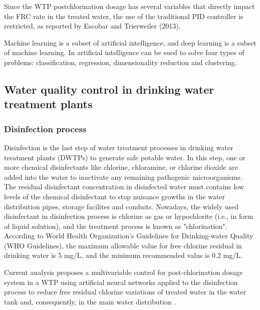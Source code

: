 Since the WTP postchlorination dosage has several variables that directly impact the FRC rate in the treated water, the use of the traditional PID controller is restricted, as reported by Escobar and Trierweiler (2013).

Machine learning is a subset of artificial intelligence, and deep learning is a subset 
of machine learning. In artificial intelligence can be sued to solve four types of problems: 
classification, regression, dimensionality reduction and clustering. 
\subsection{Water quality control in drinking water treatment plants}
\subsubsection{Disinfection process}
Disinfection is the last step of water treatment processes in drinking water treatment plants (DWTPs) to generate safe potable water. In this step, one or more chemical disinfectants like chlorine, chloramine, or chlorine dioxide are added into the water to inactivate any remaining pathogenic microorganisms. The residual disinfectant concentration in disinfected water must contains low levels of the chemical disinfectant to stop nuisance growths in the water distribution pipes, storage facilites and conduits. Nowadays, the widely used disinfectant in disinfection process is chlorine as gas or hypochlorite (i.e., in form of liquid solution), and the treatment process is known as "chlorination". According to World Health Organization's Guidelines for Drinking-water Quality (WHO Guidelines), the maximum allowable value for free chlorine residual in drinking water is 5 mg/L, and the minimum recommended valus is 0.2 mg/L. 

Current analysis proposes a multivariable control for post-chlorination dosage system in a WTP using artificial neural networks applied to the disinfection process to reduce free residual chlorine variations of treated water in the water tank and, consequently, in the main water distribution \cite{librantzArtificialNeuralNetworks2018}.

